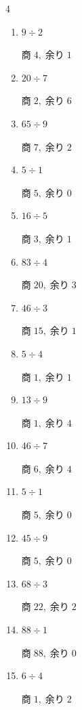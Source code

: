 \begin{multicols}{4}
\begin{enumerate}
        $商\; 12,\; 余り\; 0$

  \item $9 \div 2$

        $商\; 4,\; 余り\; 1$

  \item $20 \div 7$

        $商\; 2,\; 余り\; 6$

  \item $65 \div 9$

        $商\; 7,\; 余り\; 2$

  \item $5 \div 1$

        $商\; 5,\; 余り\; 0$

  \item $16 \div 5$

        $商\; 3,\; 余り\; 1$

  \item $83 \div 4$

        $商\; 20,\; 余り\; 3$

  \item $46 \div 3$

        $商\; 15,\; 余り\; 1$

  \item $5 \div 4$

        $商\; 1,\; 余り\; 1$

  \item $13 \div 9$

        $商\; 1,\; 余り\; 4$

  \item $46 \div 7$

        $商\; 6,\; 余り\; 4$

  \item $5 \div 1$

        $商\; 5,\; 余り\; 0$

  \item $45 \div 9$

        $商\; 5,\; 余り\; 0$

  \item $68 \div 3$

        $商\; 22,\; 余り\; 2$

  \item $88 \div 1$

        $商\; 88,\; 余り\; 0$

  \item $6 \div 4$

        $商\; 1,\; 余り\; 2$


\end{enumerate}
\end{multicols}

